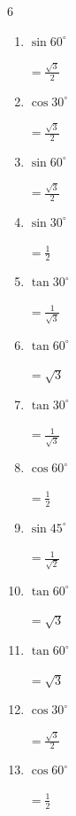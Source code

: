 \begin{multicols}{6}
\begin{enumerate}
  \item $\displaystyle \sin{60^\circ}$

        $\displaystyle =\frac{\sqrt{3}}{2}$

  \item $\displaystyle \cos{30^\circ}$

        $\displaystyle =\frac{\sqrt{3}}{2}$

  \item $\displaystyle \sin{60^\circ}$

        $\displaystyle =\frac{\sqrt{3}}{2}$

  \item $\displaystyle \sin{30^\circ}$

        $\displaystyle =\frac{1}{2}$

  \item $\displaystyle \tan{30^\circ}$

        $\displaystyle =\frac{1}{\sqrt{3}}$

  \item $\displaystyle \tan{60^\circ}$

        $\displaystyle =\sqrt{3}$

  \item $\displaystyle \tan{30^\circ}$

        $\displaystyle =\frac{1}{\sqrt{3}}$

  \item $\displaystyle \cos{60^\circ}$

        $\displaystyle =\frac{1}{2}$

  \item $\displaystyle \sin{45^\circ}$

        $\displaystyle =\frac{1}{\sqrt{2}}$

  \item $\displaystyle \tan{60^\circ}$

        $\displaystyle =\sqrt{3}$

  \item $\displaystyle \tan{60^\circ}$

        $\displaystyle =\sqrt{3}$

  \item $\displaystyle \cos{30^\circ}$

        $\displaystyle =\frac{\sqrt{3}}{2}$

  \item $\displaystyle \cos{60^\circ}$

        $\displaystyle =\frac{1}{2}$


\end{enumerate}
\end{multicols}
